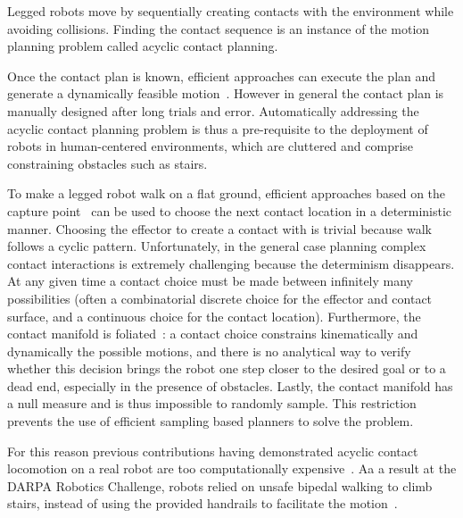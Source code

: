 
Legged robots move by sequentially creating contacts with the environment while avoiding collisions. Finding the contact sequence is an instance of the motion planning problem called acyclic contact planning.

Once the contact plan is known, efficient approaches can execute the plan and generate a dynamically feasible motion~\citep{Carpentier2016}. However in general
the contact plan is manually designed after long trials and error. Automatically addressing the acyclic contact planning problem is thus a pre-requisite to the deployment of robots in human-centered environments, which are cluttered and comprise constraining obstacles such as stairs.

To make a legged robot walk on a flat ground, efficient approaches based on the capture point~\citep{Pratt2006} can be used to choose the next contact location in a deterministic manner. Choosing the effector to create a contact with is trivial because walk follows a cyclic pattern.
Unfortunately, in the general case planning complex contact interactions is extremely challenging because the determinism disappears.
At any given time a contact choice must be made between infinitely many possibilities (often a combinatorial discrete choice for the effector and contact surface, and a continuous choice for the contact location). Furthermore, the contact manifold is foliated~\citep{simeon-manipulation-04}: a contact choice constrains kinematically and dynamically the possible motions, and there is no analytical way to verify whether this decision brings the robot one step closer to the desired goal or to a dead end, especially in the presence of obstacles. Lastly, the contact manifold has a null measure and is thus impossible to randomly sample. This restriction prevents the use of efficient sampling based planners to solve the problem.


For this reason previous contributions having demonstrated acyclic contact locomotion on a real robot are too computationally expensive~\citep{Bretl:2006:MPM:1124573.1124585}. Aa a result at the DARPA Robotics Challenge, robots relied on unsafe bipedal walking to climb stairs, instead of using the provided handrails to facilitate the motion~\citep{atkensondarpa}. 

